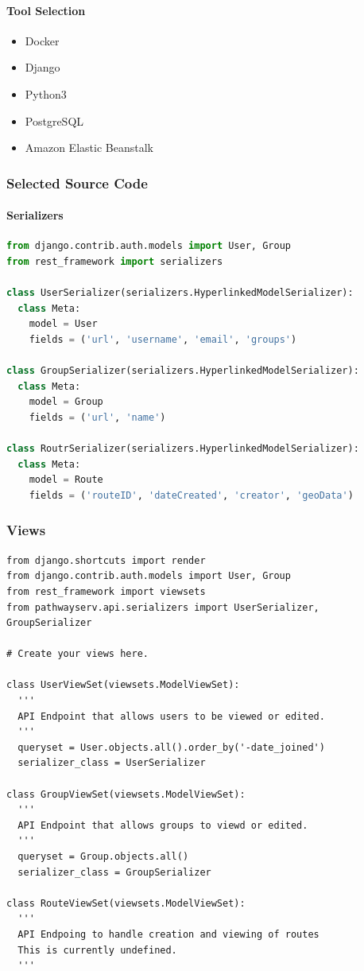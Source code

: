 ﻿\documentclass{article}
\begin{document}
\paragraph{Tool Selection}
\begin{itemize}
    \item Docker
    \item Django
    \item Python3
    \item PostgreSQL
    \item Amazon Elastic Beanstalk
\end{itemize}

\subsubsection{Selected Source Code}
\paragraph{Serializers}
\begin{lstlisting}[language=Python]
from django.contrib.auth.models import User, Group
from rest_framework import serializers

class UserSerializer(serializers.HyperlinkedModelSerializer):
  class Meta:
    model = User
    fields = ('url', 'username', 'email', 'groups')

class GroupSerializer(serializers.HyperlinkedModelSerializer):
  class Meta:
    model = Group
    fields = ('url', 'name')

class RoutrSerializer(serializers.HyperlinkedModelSerializer):
  class Meta:
    model = Route
    fields = ('routeID', 'dateCreated', 'creator', 'geoData')
\end{lstlisting}

\subsubsection{Views}
\begin{lstlisting}[langauge=Python]
from django.shortcuts import render
from django.contrib.auth.models import User, Group
from rest_framework import viewsets
from pathwayserv.api.serializers import UserSerializer, GroupSerializer

# Create your views here.

class UserViewSet(viewsets.ModelViewSet):
  '''
  API Endpoint that allows users to be viewed or edited.
  '''
  queryset = User.objects.all().order_by('-date_joined')
  serializer_class = UserSerializer

class GroupViewSet(viewsets.ModelViewSet):
  '''
  API Endpoint that allows groups to viewd or edited.
  '''
  queryset = Group.objects.all()
  serializer_class = GroupSerializer

class RouteViewSet(viewsets.ModelViewSet):
  '''
  API Endpoing to handle creation and viewing of routes
  This is currently undefined.
  '''
\end{lstlisting}
\end{document}
